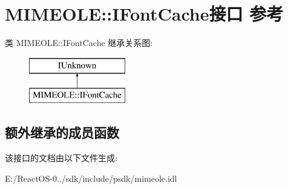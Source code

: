 \hypertarget{interface_m_i_m_e_o_l_e_1_1_i_font_cache}{}\section{M\+I\+M\+E\+O\+LE\+:\+:I\+Font\+Cache接口 参考}
\label{interface_m_i_m_e_o_l_e_1_1_i_font_cache}
类 M\+I\+M\+E\+O\+LE\+:\+:I\+Font\+Cache 继承关系图\+:\begin{figure}[H]
\begin{center}
\leavevmode
\includegraphics[height=2.000000cm]{interface_m_i_m_e_o_l_e_1_1_i_font_cache}
\end{center}
\end{figure}
\subsection*{额外继承的成员函数}


该接口的文档由以下文件生成\+:\begin{DoxyCompactItemize}
\item 
E\+:/\+React\+O\+S-\/0../sdk/include/psdk/mimeole.\+idl\end{DoxyCompactItemize}
